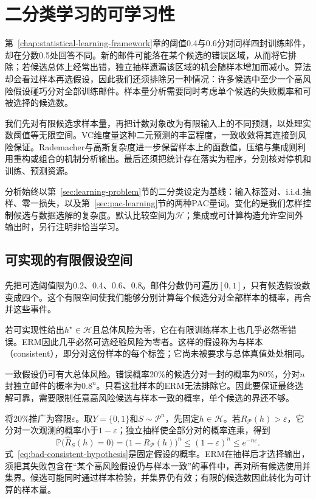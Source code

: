 \chapter{二分类学习的可学习性}
\label{chap:binary-learnability}

第~\ref{chap:statistical-learning-framework}章的阈值0.4与0.6分对同样四封训练邮件，却在分数0.5处回答不同。新的邮件可能落在某个候选的错误区域，从而将它排除；若候选总体上经常出错，独立抽样遗漏该区域的机会随样本增加而减小。算法却会看过样本再选假设，因此我们还须排除另一种情况：许多候选中至少一个高风险假设碰巧分对全部训练邮件。样本量分析需要同时考虑单个候选的失败概率和可被选择的候选数。

我们先对有限候选求样本量，再把计数对象改为有限输入上的不同预测，以处理实数阈值等无限空间。VC维度量这种二元预测的丰富程度，一致收敛将其连接到风险保证。Rademacher与高斯复杂度进一步保留样本上的函数值，压缩与集成则利用重构或组合的机制分析输出。最后还须把统计存在落实为程序，分别核对停机和训练、预测资源。

分析始终以第~\ref{sec:learning-problem}节的二分类设定为基线：输入标签对、i.i.d.抽样、零一损失，以及第~\ref{sec:pac-learning}节的两种PAC量词。变化的是我们怎样控制候选与数据选解的复杂度。默认比较空间为$\mathcal H$；集成或可计算构造允许空间外输出时，另行注明非恰当学习。

\section{可实现的有限假设空间}
\label{sec:binary-finite-class}

先把可选阈值限为0.2、0.4、0.6、0.8。邮件分数仍可遍历$[0,1]$，只有候选假设数变成四个。这个有限空间使我们能够分别计算每个候选分对全部样本的概率，再合并这些事件。

若可实现性给出$h^\star\in\mathcal H$且总体风险为零，它在有限训练样本上也几乎必然零错误。ERM因此几乎必然可选经验风险为零者。这样的假设称为与样本（consistent），即分对这份样本的每个标签；它尚未被要求与总体真值处处相同。

一致假设仍可有大总体风险。错误概率20\%的候选分对一封的概率为80\%，分对$n$封独立邮件的概率为$0.8^n$。只看这批样本的ERM无法排除它。因此要保证最终选解可靠，需要限制任意高风险候选与样本一致的概率，单个候选的界还不够。

将20\%推广为容限$\varepsilon$。取$Y=\{0,1\}$和$S\sim\mathcal P^n$，先固定$h\in\mathcal H$。若$R_{\mathcal P}(h)>\varepsilon$，它分对一次观测的概率小于$1-\varepsilon$；独立抽样使全部分对的概率连乘，得到
\begin{equation}
  \mathbb P\bigl(\hat R_S(h)=0\bigr)
  =\bigl(1-R_{\mathcal P}(h)\bigr)^n
  \leq(1-\varepsilon)^n\leq e^{-n\varepsilon}.
  \label{eq:bad-consistent-hypothesis}
\end{equation}
式~\eqref{eq:bad-consistent-hypothesis}是固定假设的概率。ERM在抽样后才选择输出，须把其失败包含在“某个高风险假设仍与样本一致”的事件中，再对所有候选使用并集界。候选可能同时通过样本检验，并集界仍有效；有限的候选数因此转化为可计算的样本量。

